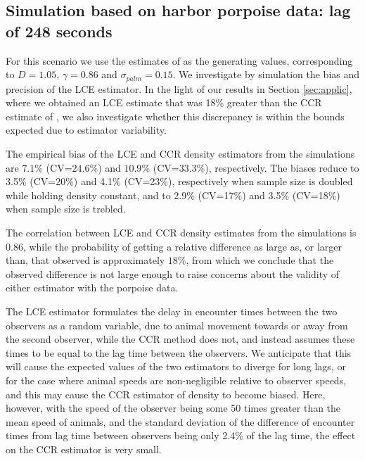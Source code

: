 \documentclass[useAMS, usenatbib, referee]{biom}\usepackage[]{graphicx}\usepackage[]{color}
\begin{document}

\subsection{Simulation based on harbor porpoise data: lag of 248 seconds}

For this scenario we use the estimates of \cite{Stevenson+al:18} as the generating values, corresponding to $D=1.05$, $\gamma=0.86$ and $\sigma_{palm}=0.15$. We investigate by simulation the bias and precision of the LCE estimator. In the light of our results in Section \ref{sec:applic}, where we obtained an LCE estimate that was 18\% greater than the CCR estimate of \cite{Stevenson+al:18}, we also investigate whether this discrepancy is within the bounds expected due to estimator variability.





The empirical bias of the LCE and CCR density estimators from the simulations are $7.1$\% (CV=$24.6$\%) and $10.9$\% (CV=$33.3$\%), respectively. The biases reduce to 3.5\% (CV=20\%) and 4.1\% (CV=23\%), respectively when sample size is doubled while holding density constant, and to 2.9\% (CV=17\%) and 3.5\%  (CV=18\%) when sample size is trebled.


The correlation between LCE and CCR density estimates from the simulations is $0.86$, while the probability of getting a relative difference as large as, or larger than, that observed is approximately $18$\%, from which we conclude that the observed difference is not large enough to raise concerns about the validity of either estimator with the porpoise data.


The LCE estimator formulates the delay in encounter times between the two observers as a random variable, due to animal movement towards or away from the second observer, while the CCR method does not, and instead assumes these times to be equal to the lag time between the observers. We anticipate that this will cause the expected values of the two estimators to diverge for long lags, or for the case where animal speeds are non-negligible relative to observer speeds, and this may cause the CCR estimator of density to become biased. Here, however, with the speed of the observer being some 50 times greater than the mean speed of animals, and the standard deviation of the difference of encounter times from lag time between observers being only 2.4\% of the lag time, the effect on the CCR estimator is very small.
\end{document}
